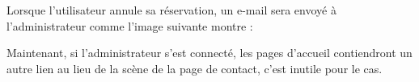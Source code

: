 \documentclass{article}
\begin{document}
\begin{enumerate}
  \vspace{0.7cm}
               \hspace*{-0.7in}
               \noindent{}
  
  
Lorsque l'utilisateur annule sa réservation, un e-mail sera envoyé à l'administrateur comme l'image suivante montre :  
  
	\vspace{0.7cm}
               \hspace*{-0.7in}
               \noindent{}  
  
  
  
  
  
  
  
  
  
  
Maintenant, si l'administrateur s'est connecté, les pages d'accueil contiendront un autre lien au lieu de la scène de la page de contact, c'est inutile pour le cas.
  

\end{enumerate}
\end{document}
